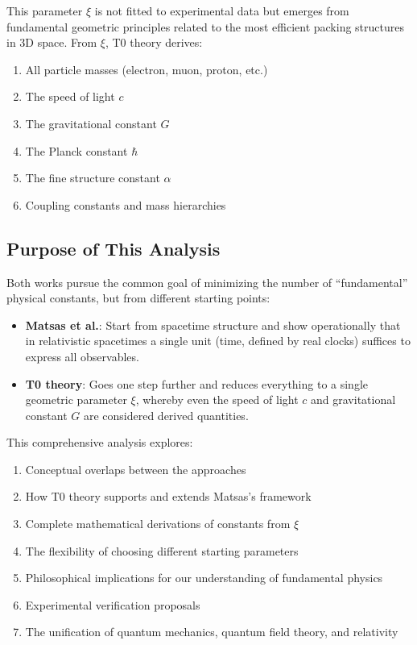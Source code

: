 	This parameter $\xi$ is not fitted to experimental data but emerges from fundamental geometric principles related to the most efficient packing structures in 3D space. From $\xi$, T0 theory derives:
	
	\begin{enumerate}
		\item All particle masses (electron, muon, proton, etc.)
		\item The speed of light $c$
		\item The gravitational constant $G$
		\item The Planck constant $\hbar$
		\item The fine structure constant $\alpha$
		\item Coupling constants and mass hierarchies
	\end{enumerate}
	
	\subsection{Purpose of This Analysis}
	
	Both works pursue the common goal of minimizing the number of ``fundamental'' physical constants, but from different starting points:
	
	\begin{itemize}
		\item \textbf{Matsas et al.}: Start from spacetime structure and show operationally that in relativistic spacetimes a single unit (time, defined by real clocks) suffices to express all observables.
		
		\item \textbf{T0 theory}: Goes one step further and reduces everything to a single geometric parameter $\xi$, whereby even the speed of light $c$ and gravitational constant $G$ are considered derived quantities.
	\end{itemize}
	
	This comprehensive analysis explores:
	\begin{enumerate}
		\item Conceptual overlaps between the approaches
		\item How T0 theory supports and extends Matsas's framework
		\item Complete mathematical derivations of constants from $\xi$
		\item The flexibility of choosing different starting parameters
		\item Philosophical implications for our understanding of fundamental physics
		\item Experimental verification proposals
		\item The unification of quantum mechanics, quantum field theory, and relativity
	\end{enumerate}
	
